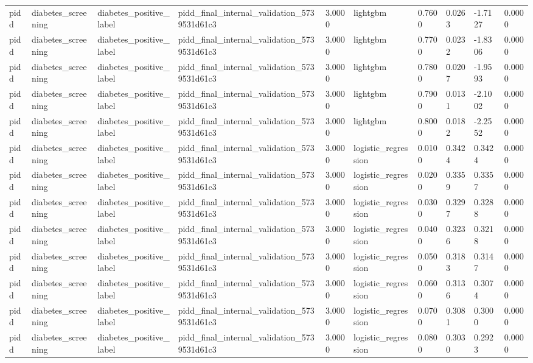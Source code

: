\begin{tabular}{llllllllll}
pidd & diabetes\_screening & diabetes\_positive\_label & pidd\_final\_internal\_validation\_5739531d61c3 & 3.0000 & lightgbm & 0.7600 & 0.0263 & -1.7127 & 0.0000 \\
pidd & diabetes\_screening & diabetes\_positive\_label & pidd\_final\_internal\_validation\_5739531d61c3 & 3.0000 & lightgbm & 0.7700 & 0.0232 & -1.8306 & 0.0000 \\
pidd & diabetes\_screening & diabetes\_positive\_label & pidd\_final\_internal\_validation\_5739531d61c3 & 3.0000 & lightgbm & 0.7800 & 0.0207 & -1.9593 & 0.0000 \\
pidd & diabetes\_screening & diabetes\_positive\_label & pidd\_final\_internal\_validation\_5739531d61c3 & 3.0000 & lightgbm & 0.7900 & 0.0131 & -2.1002 & 0.0000 \\
pidd & diabetes\_screening & diabetes\_positive\_label & pidd\_final\_internal\_validation\_5739531d61c3 & 3.0000 & lightgbm & 0.8000 & 0.0182 & -2.2552 & 0.0000 \\
pidd & diabetes\_screening & diabetes\_positive\_label & pidd\_final\_internal\_validation\_5739531d61c3 & 3.0000 & logistic\_regression & 0.0100 & 0.3424 & 0.3424 & 0.0000 \\
pidd & diabetes\_screening & diabetes\_positive\_label & pidd\_final\_internal\_validation\_5739531d61c3 & 3.0000 & logistic\_regression & 0.0200 & 0.3359 & 0.3357 & 0.0000 \\
pidd & diabetes\_screening & diabetes\_positive\_label & pidd\_final\_internal\_validation\_5739531d61c3 & 3.0000 & logistic\_regression & 0.0300 & 0.3297 & 0.3288 & 0.0000 \\
pidd & diabetes\_screening & diabetes\_positive\_label & pidd\_final\_internal\_validation\_5739531d61c3 & 3.0000 & logistic\_regression & 0.0400 & 0.3236 & 0.3218 & 0.0000 \\
pidd & diabetes\_screening & diabetes\_positive\_label & pidd\_final\_internal\_validation\_5739531d61c3 & 3.0000 & logistic\_regression & 0.0500 & 0.3183 & 0.3147 & 0.0000 \\
pidd & diabetes\_screening & diabetes\_positive\_label & pidd\_final\_internal\_validation\_5739531d61c3 & 3.0000 & logistic\_regression & 0.0600 & 0.3136 & 0.3074 & 0.0000 \\
pidd & diabetes\_screening & diabetes\_positive\_label & pidd\_final\_internal\_validation\_5739531d61c3 & 3.0000 & logistic\_regression & 0.0700 & 0.3081 & 0.3000 & 0.0000 \\
pidd & diabetes\_screening & diabetes\_positive\_label & pidd\_final\_internal\_validation\_5739531d61c3 & 3.0000 & logistic\_regression & 0.0800 & 0.3030 & 0.2923 & 0.0000 \\

\end{tabular}
